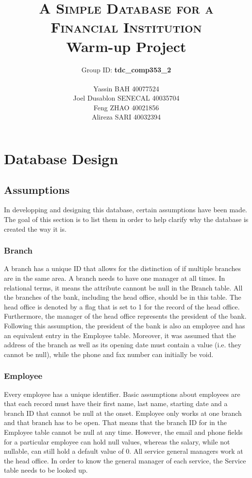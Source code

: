\documentclass[letterpaper, 12pt]{article}
\title{
  \textsc{\huge A Simple Database for a Financial Institution}\\
  Warm-up Project
  \vspace*{4em}
}
\author{
  Group ID: \textbf{tdc\_comp353\_2}\\\\
  Yassin BAH 40077524\\
  Joel Dusablon SENECAL 40035704\\
  Feng ZHAO 40021856\\
  Alireza SARI 40032394\\ 
  \vspace*{6em}
}
\begin{document}
\maketitle
\newpage


\section{Database Design}
\subsection{Assumptions}
In developping and designing this database, certain assumptions have been made.
The goal of this section is to list them in order to help clarify why the database is created the way it is.

\subsubsection{Branch}
A branch has a unique ID that allows for the distinction of if multiple branches are in the same area.
A branch needs to have one manager at all times.
In relational terms, it means the attribute cannont be null in the Branch table.
All the branches of the bank, including the head office, should be in this table.
The head office is denoted by a flag that is set to 1 for the record of the head office.
Furthermore, the manager of the head office represents the president of the bank.
Following this assumption, the president of the bank is also an employee and has an equivalent entry in the Employee table.
Moreover, it was assumed that the address of the branch as well as its opening date must contain a value (i.e. they cannot be null), while the phone and fax number can initially be void.   

\subsubsection{Employee}
Every employee has a unique identifier.
Basic assumptions about employees are that each record must have their first name, last name, starting date and a branch ID that cannot be null at the onset.
Employee only works at one branch and that branch has to be open.
That means that the branch ID for in the Employee table cannot be null at any time.
However, the email and phone fields for a particular employee can hold null values, whereas the salary, while not nullable, can still hold a default value of 0. 
All service general managers work at the head office.
In order to know the general manager of each service, the Service table needs to be looked up.
\end{document}
